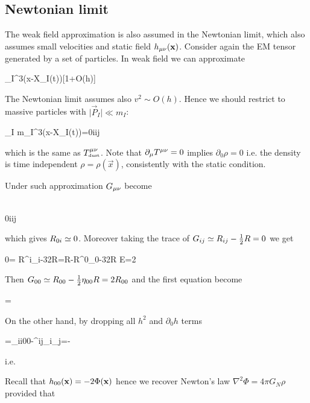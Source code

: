 \documentclass[../main/main.tex]{subfiles}
\begin{document}
\subsection{Newtonian limit}

The weak field approximation is also assumed in the Newtonian limit, which also assumes small velocities and static field $h_{\mu \nu}(\mathbf x)$. 
Consider again the EM tensor generated by a set of particles. In weak field we can approximate
\begin{eqalign}
	\iemt\mu\nu\simeq\sum_I\delta^3(\vec x-\vec X_I(t))[1+O(h)]
\end{eqalign}
The Newtonian limit assumes also $v^2\sim O(h)$. Hence we should restrict to massive particles with $\vert\vec P_I\vert\ll m_I$:
\begin{eqalign}
	\simeq\sum_I m_I\delta^3(\vec x-\vec X_I(t))=\rho \comma \iemt0i\simeq\iemt ij
\end{eqalign}
which is the same as $T^{\mu \nu}_{\text{\tiny dust}}$. Note that $\partial_\mu T^{\mu \nu}=0$ implies $\partial_0\rho=0$ i.e. the density is time independent $\rho=\rho(\vec x)$, consistently with the static condition.

Under such approximation $G_{\mu \nu}$ become
\begin{eqalign}
	\begin{cases}
		\simeq \kappa\rho\\
		\eten0i\simeq\eten ij
	\end{cases}
\end{eqalign}
which gives $R_{0 i}\simeq0$. Moreover taking the trace of $G_{i j} \simeq R_{i j}-\frac12 R=0$ we get
\begin{eqalign}
	0= {R^i}_i-\frac32R=R-{R^0}_0-\frac32R \implies E=2
\end{eqalign}
Then $G_{0 0}\simeq R_{0 0}-\frac12\eta_{0 0}R=2R_{0 0}$ and the first equation become
\begin{eqalign}
	=\kappa\rho
\end{eqalign}
On the other hand, by dropping all $h^2$ and $\partial_0h$ terms
\begin{eqalign}
	=\curv\mu0\simeq\partial_i\chris i00\simeq-\delta^{ij}\partial_i\partial_j=-\Delta{}
\end{eqalign}
i.e.
\begin{eqalign}\end{eqalign}
Recall that $h_{0 0}(\mathbf x)=-2\Phi(\mathbf x)$ hence we recover Newton's law $\nabla^2\Phi=4\pi G_N\rho$ provided that
\begin{eqalign}\end{eqalign}
\end{document}
